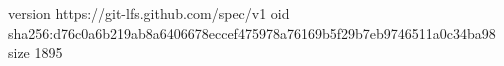 version https://git-lfs.github.com/spec/v1
oid sha256:d76c0a6b219ab8a6406678eccef475978a76169b5f29b7eb9746511a0c34ba98
size 1895
